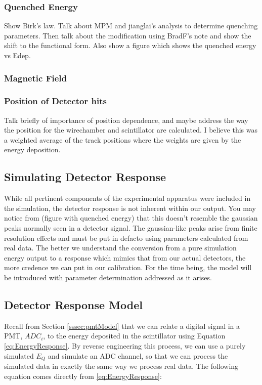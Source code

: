 \subsubsection{Quenched Energy} \label{sssec:Equenched}
Show Birk's law. Talk about MPM and jianglai's analysis to determine
quenching parameters. Then talk about the modification using BradF's note
and show the shift to the functional form. Also show a figure which shows
the quenched energy vs Edep.

\subsubsection{Magnetic Field} \label{sssec:simMagField}

\subsubsection{Position of Detector hits}
Talk briefly of importance of position dependence, and maybe address
the way the position for the wirechamber and scintillator are calculated.
I believe this was a weighted average of the track positions where the
weights are given by the energy deposition.

\subsection{Simulating Detector Response}
While all pertinent components of the experimental apparatus were included
in the simulation, the detector response is not inherent within our
output. You may notice from (figure with quenched energy) that this
doesn't resemble the gaussian peaks normally seen in a detector signal.
The gaussian-like peaks arise from finite resolution effects and
must be put in defacto using parameters calculated
from real data. The better we understand the conversion from a pure simulation
energy output to a response which mimics that from our actual detectors, the
more credence we can put in our calibration. For the time being, the model will
be introduced with parameter determination addressed as it arises. 

\subsection{Detector Response Model}

Recall from Section \ref{sssec:pmtModel} that we can relate a digital signal
in a PMT, $ADC_i$, to the energy deposited in the scintillator
using Equation \ref{eq:EnergyResponse}.
By reverse engineering this process, we can use a purely simulated $E_Q$ and
simulate an ADC channel, so that we can process the simulated data in
exactly the same way we process real data. The following equation comes directly
from \ref{eq:EnergyResponse}:

